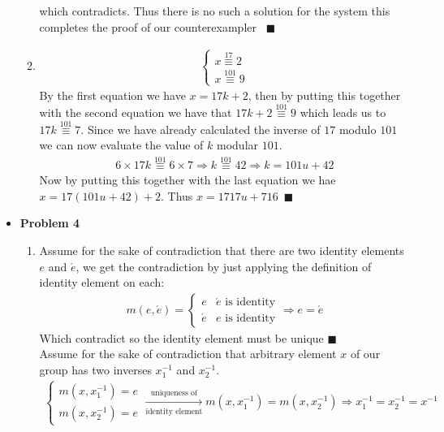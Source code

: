 \documentclass{article}
\begin{document}
\begin{itemize}
\begin{enumerate}[label=(\alph*)]
		which contradicts. Thus there is no such a solution for the system this completes the proof of our counterexampler~ $\blacksquare$
		\item
			\begin{align*}
				\left\{\begin{array}{l}
						x\stackrel{17}{\equiv}2 \\
						x\stackrel{101}{\equiv}9
					\end{array}\right.
			\end{align*}
			By the first equation we have $x=17k+2$, then by putting this together with the second equation 
			we have that $17k+2\stackrel{101}{\equiv}9$ which leads us to $17k\stackrel{101}{\equiv}7$. Since we have already 
			calculated the inverse of $17$ modulo $101$ we can now evaluate the value of $k$ modular $101$.
			\begin{align*}
				6 \times 17k \stackrel{101}{\equiv} 6 \times 7 \Rightarrow k \stackrel{101}{\equiv} 42 \Rightarrow
				k = 101u+42
			\end{align*}
			Now by putting this together with the last equation we hae $x=17(101u+42)+2$. Thus $x=1717u+716$~$\blacksquare$
		\end{enumerate}
	\item{\textcolor{for}{\textbf{Problem 4}}}
		\begin{enumerate}[label=(\alph*)]

			\item Assume for the sake of contradiction that there are two identity elements $e$ and $\acute{e}$, we get the contradiction by just
			  applying the definition of identity element on each:
			  \begin{align*}
				m\left(e,\acute{e}\right) =
				\left\{\begin{array}{ll}
						e & \acute{e}\text{ is identity} \\
						\acute{e} & e \text{ is identity}
					\end{array}\right.
				\Longrightarrow e=\acute{e}
			  \end{align*}
			  Which contradict so the identity element must be unique $\blacksquare$\\[5pt]
			  Assume for the sake of contradiction 
			  that arbitrary element $x$ of our group has two inverses $x_{1}^{-1}$ and $x_{2}^{-1}$.
			  \begin{align*}
				\left\{\begin{array}{ll}
						m(x, x_{1}^{-1}) = e \\
						m(x, x_{2}^{-1}) = e
				\end{array}\right. \xrightarrow[\text{identity element}]{\text{uniqueness of}}
				m(x,x_{1}^{-1}) = m(x,x_{2}^{-1}) \Rightarrow x_{1}^{-1} = x_{2}^{-1} = x^{-1}
			  \end{align*}


\end{enumerate}
\end{itemize}
\end{document}
